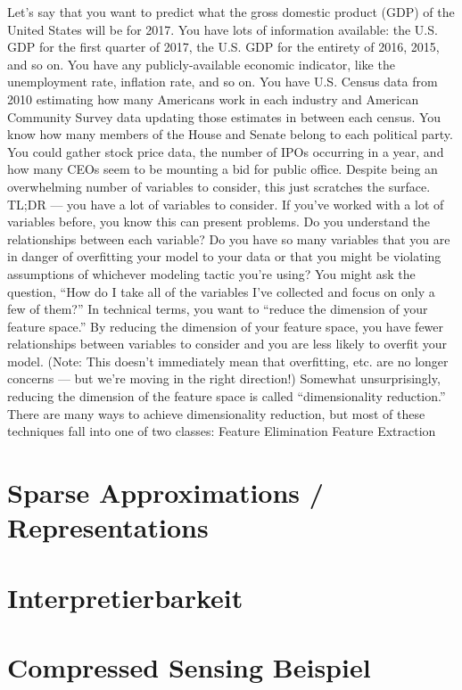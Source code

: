 Let’s say that you want to predict what the gross domestic product (GDP) of the United States will be for 2017. You have lots of information available: the U.S. GDP for the first quarter of 2017, the U.S. GDP for the entirety of 2016, 2015, and so on. You have any publicly-available economic indicator, like the unemployment rate, inflation rate, and so on. You have U.S. Census data from 2010 estimating how many Americans work in each industry and American Community Survey data updating those estimates in between each census. You know how many members of the House and Senate belong to each political party. You could gather stock price data, the number of IPOs occurring in a year, and how many CEOs seem to be mounting a bid for public office. Despite being an overwhelming number of variables to consider, this just scratches the surface.
TL;DR — you have a lot of variables to consider.
If you’ve worked with a lot of variables before, you know this can present problems. Do you understand the relationships between each variable? Do you have so many variables that you are in danger of overfitting your model to your data or that you might be violating assumptions of whichever modeling tactic you’re using?
You might ask the question, “How do I take all of the variables I’ve collected and focus on only a few of them?” In technical terms, you want to “reduce the dimension of your feature space.” By reducing the dimension of your feature space, you have fewer relationships between variables to consider and you are less likely to overfit your model. (Note: This doesn’t immediately mean that overfitting, etc. are no longer concerns — but we’re moving in the right direction!)
Somewhat unsurprisingly, reducing the dimension of the feature space is called “dimensionality reduction.” There are many ways to achieve dimensionality reduction, but most of these techniques fall into one of two classes:
Feature Elimination
Feature Extraction

\section{Sparse Approximations / Representations}

\section{Interpretierbarkeit}

\section{Compressed Sensing Beispiel}